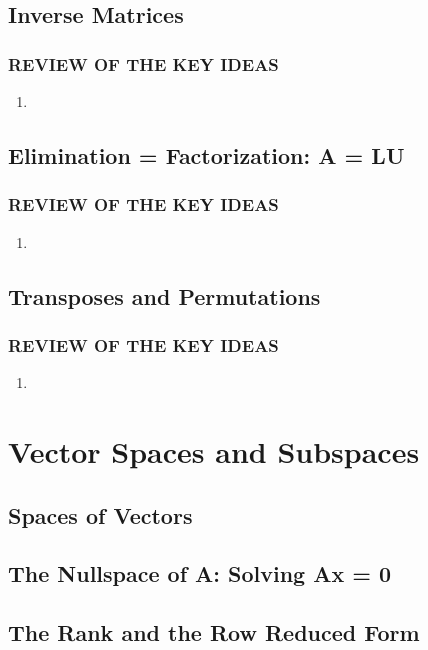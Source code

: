 \documentclass{book}
\begin{document}
\section{Inverse Matrices}
\subsection*{REVIEW OF THE KEY IDEAS}
    \begin{enumerate}
        \item  
    \end{enumerate}

\section{Elimination = Factorization: A = LU}
\subsection*{REVIEW OF THE KEY IDEAS}
    \begin{enumerate}
        \item  
    \end{enumerate}

\section{Transposes and Permutations}
\subsection*{REVIEW OF THE KEY IDEAS}
    \begin{enumerate}
        \item  
    \end{enumerate}


\chapter{Vector Spaces and Subspaces}
\section{Spaces of Vectors}

\section{The Nullspace of A: Solving Ax = 0}

\section{The Rank and the Row Reduced Form}
\end{document}
